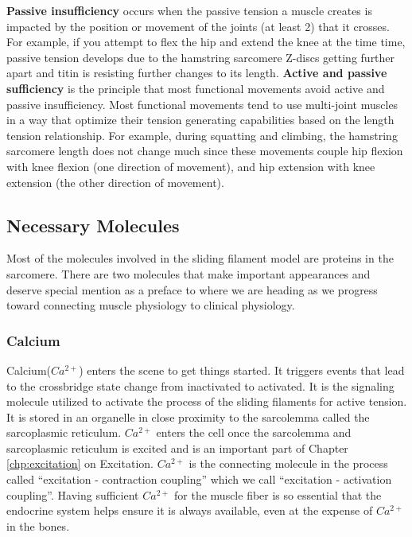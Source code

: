 \textbf{Passive insufficiency} occurs when the passive tension a muscle creates is impacted by the position or movement of the joints (at least 2) that it crosses. For example, if you attempt to flex the hip and extend the knee at the time time, passive tension develops due to the hamstring sarcomere Z-discs getting further apart and titin is resisting further changes to its length.\footnotemark{}
\textbf{Active and passive sufficiency} is the principle that most functional movements avoid active and passive insufficiency. Most functional movements tend to use multi-joint muscles in a way that optimize their tension generating capabilities based on the length tension relationship. For example, during squatting and climbing, the hamstring sarcomere length does not change much since these movements couple hip flexion with knee flexion (one direction of movement), and hip extension with knee extension (the other direction of movement).

\subsection{Necessary Molecules}
Most of the molecules involved in the sliding filament model are proteins in the sarcomere. There are two molecules that make important appearances and deserve special mention as a preface to where we are heading as we progress toward connecting muscle physiology to clinical physiology.

\subsubsection{Calcium} 
Calcium($Ca^{2+}$) enters the scene to get things started. It triggers events that lead to the crossbridge state change from inactivated to activated. It is the signaling molecule utilized to activate the process of the sliding filaments for active tension. It is stored in an organelle in close proximity to the sarcolemma called the sarcoplasmic reticulum. $Ca^{2+}$ enters the cell once the sarcolemma and sarcoplasmic reticulum is excited and is an important part of Chapter \ref{chp:excitation} on Excitation. $Ca^{2+}$ is the connecting molecule in the process called “excitation - contraction coupling” which we call “excitation - activation coupling”. Having sufficient $Ca^{2+}$ for the muscle fiber is so essential that the endocrine system helps ensure it is always available, even at the expense of $Ca^{2+}$ in the bones.

